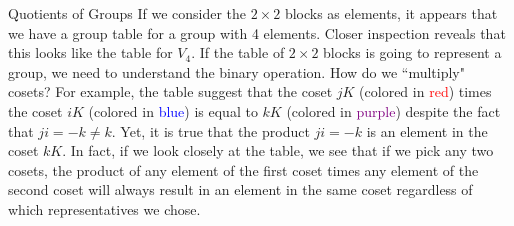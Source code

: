 \begin{section}{Quotients of Groups}
If we consider the $2\times 2$ blocks as elements, it appears that we have a group table for a group with 4 elements.  Closer inspection reveals that this looks like the table for $V_4$.  If the table of $2\times 2$ blocks is going to represent a group, we need to understand the binary operation.  How do we ``multiply" cosets?  For example, the table suggest that the coset $jK$ (colored in \textcolor{red}{red}) times the coset $iK$ (colored in \textcolor{blue}{blue}) is equal to $kK$ (colored in \textcolor{purple}{purple}) despite the fact that $ji=-k\neq k$.  Yet, it is true that the product $ji=-k$ is an element in the coset $kK$.  In fact, if we look closely at the table, we see that if we pick any two cosets, the product of any element of the first coset times any element of the second coset will always result in an element in the same coset regardless of which representatives we chose.


\end{section}

